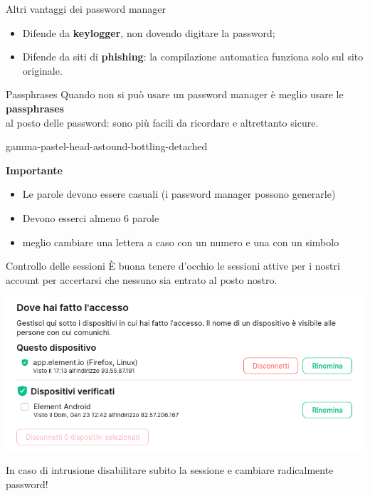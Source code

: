 \begin{myframe}{Altri vantaggi dei password manager}
  \begin{itemize}
    \item Difende da \textbf{keylogger}, non dovendo digitare la password;
    \item Difende da siti di \textbf{phishing}: la compilazione automatica funziona solo sul sito originale.
  \end{itemize}
\end{myframe}

\begin{myframe}{Passphrases}
  Quando non si può usare un password manager è meglio usare  le \textbf{passphrases}\\al posto delle password: sono più facili da ricordare e altrettanto sicure.

  \pause\bigskip
  gamma-pastel-head-astound-bottling-detached

  \pause\bigskip
  {\raggedright\textbf{Importante}\\}
  \begin{itemize}
    \item Le parole devono essere casuali (i password manager possono generarle)
    \item Devono esserci almeno 6 parole
    \item meglio cambiare una lettera a caso con un numero e una con un simbolo
  \end{itemize}
\end{myframe}

\begin{myframe}{Controllo delle sessioni}
  È buona tenere d'occhio le sessioni attive per i nostri account per accertarsi che nessuno sia entrato al posto nostro.

  \includegraphics[width=.7\textwidth]{img/sessioni}

  \medskip\pause
  In caso di intrusione disabilitare subito la sessione e cambiare radicalmente password!
\end{myframe}
